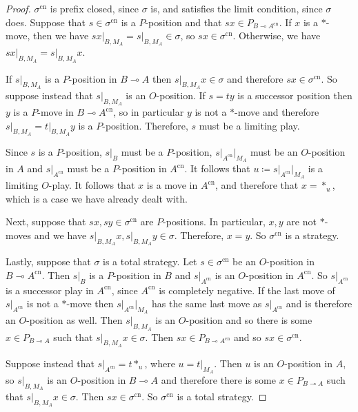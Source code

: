 \documentclass[11pt]{article} %
\theoremstyle{plain} %
\theoremstyle{definition} %
\theoremstyle{note}
\theoremstyle{exercisestyle}
\renewcommand{\implies}{\multimap}
\DeclareMathOperator{\cn}{cn}
\begin{document}
\begin{proof}
  $\sigma^{\cn}$ is prefix closed, since $\sigma$ is, and satisfies the limit condition, since $\sigma$ does.  Suppose that $s\in\sigma^{\cn}$ is a $P$-position and that $sx\in P_{B\implies A^{\cn}}$.  If $x$ is a $*$-move, then we have $sx\vert_{B,M_A}=s\vert_{B,M_A}\in\sigma$, so $sx\in\sigma^{\cn}$.  Otherwise, we have $sx\vert_{B,M_A}=s\vert_{B,M_A}x$.  

  If $s\vert_{B,M_A}$ is a $P$-position in $B\implies A$ then $s\vert_{B,M_A}x\in\sigma$ and therefore $sx\in\sigma^{\cn}$.  So suppose instead that $s\vert_{B,M_A}$ is an $O$-position.  If $s=ty$ is a successor position then $y$ is a $P$-move in $B\implies A^{\cn}$, so in particular $y$ is not a $*$-move and therefore $s\vert_{B,M_A}=t\vert_{B,M_A}y$ is a $P$-position.  Therefore, $s$ must be a limiting play.  

  Since $s$ is a $P$-position, $s\vert_B$ must be a $P$-position, $s\vert_{A^{\cn}}\vert_{M_A}$ must be an $O$-position in $A$ and $s\vert_{A^{\cn}}$ must be a $P$-position in $A^{\cn}$.  It follows that $u\coloneqq s\vert_{A^{\cn}}\vert_{M_A}$ is a limiting $O$-play.  It follows that $x$ is a move in $A^{\cn}$, and therefore that $x=*_u$, which is a case we have already dealt with.

  Next, suppose that $sx, sy\in\sigma^{\cn}$ are $P$-positions.  In particular, $x,y$ are not $*$-moves and we have $s\vert_{B,M_A}x,s\vert_{B,M_A}y\in\sigma$.  Therefore, $x=y$.  So $\sigma^{\cn}$ is a strategy.

  Lastly, suppose that $\sigma$ is a total strategy.  Let $s\in\sigma^{\cn}$ be an $O$-position in $B\implies A^{\cn}$.  Then $s\vert_B$ is a $P$-position in $B$ and $s\vert_{A^{\cn}}$ is an $O$-position in $A^{\cn}$.  So $s\vert_{A^{\cn}}$ is a successor play in $A^{\cn}$, since $A^{\cn}$ is completely negative.  If the last move of $s\vert_{A^{\cn}}$ is not a $*$-move then $s\vert_{A^{\cn}}\vert_{M_A}$ has the same last move as $s\vert_{A^{\cn}}$ and is therefore an $O$-position as well.  Then $s\vert_{B,M_A}$ is an $O$-position and so there is some $x\in P_{B\implies A}$ such that $s\vert_{B,M_A}x\in\sigma$. Then $sx\in P_{B\implies A^{\cn}}$ and so $sx\in\sigma^{\cn}$.  

  Suppose instead that $s\vert_{A^{\cn}}=t*_u$, where $u=t\vert_{M_A}$.  Then $u$ is an $O$-position in $A$, so $s\vert_{B,M_A}$ is an $O$-position in $B\implies A$ and therefore there is some $x\in P_{B\implies A}$ such that $s\vert_{B,M_A}x\in\sigma$.  Then $sx\in\sigma^{\cn}$.  So $\sigma^{\cn}$ is a total strategy.


\end{proof}
\end{document}
